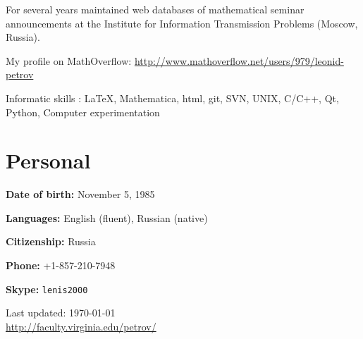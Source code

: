 \documentclass[letterpaper,11pt]{article}
\def\footerlink{http://faculty.virginia.edu/petrov/}
\begin{document}

\smallskip

For several years maintained web databases of mathematical seminar announcements at the Institute for Information Transmission Problems (Moscow, Russia).

\smallskip

My profile on MathOverflow: \url{http://www.mathoverflow.net/users/979/leonid-petrov}

\smallskip

Informatic skills : \LaTeX, Mathematica, html, git, SVN, UNIX, C/C++, Qt, Python, Computer experimentation

\section*{Personal}

\textbf{Date of birth:} November 5, 1985

\textbf{Languages:} English (fluent), Russian (native)

\textbf{Citizenship:} Russia

\textbf{Phone:} +1-857-210-7948

\textbf{Skype:} \texttt{lenis2000}



\bigskip

\begin{center}
  \begin{footnotesize}
    Last updated: \today \\
    \href{\footerlink}{\url{\footerlink}}
  \end{footnotesize}
\end{center}
 
\end{document}
